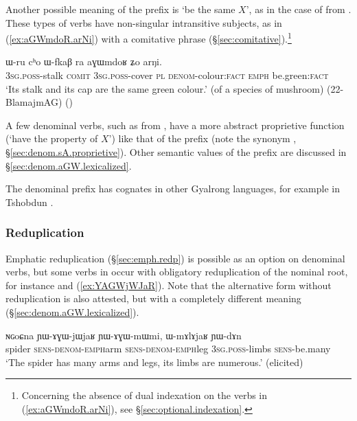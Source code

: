 Another possible meaning of the  prefix is `be the same $X$', as in the case of  from . These types of verbs have non-singular intransitive subjects, as in (\ref{ex:aGWmdoR.arNi}) with a comitative phrase (§\ref{sec:comitative}).\footnote{Concerning the absence of dual indexation on the verbs in (\ref{ex:aGWmdoR.arNi}), see §\ref{sec:optional.indexation}. }

\begin{exe}
\ex \label{ex:aGWmdoR.arNi}
\gll ɯ-ru cʰo ɯ-fkaβ ra aɣɯmdoʁ ʑo arŋi. \\
\textsc{3sg}.\textsc{poss}-stalk \textsc{comit} \textsc{3sg}.\textsc{poss}-cover \textsc{pl} \textsc{denom}-colour:\textsc{fact} \textsc{emph} be.green:\textsc{fact} \\
\glt `Its stalk and its cap are the same green colour.' (of a species of mushroom) (22-BlamajmAG)
()
 \end{exe}

A few  denominal verbs, such as 	from , have a more abstract proprietive function (`have the property of $X$') like that of the  prefix (note the synonym , §\ref{sec:denom.sA.proprietive}). Other semantic values of the  prefix are  discussed in §\ref{sec:denom.aGW.lexicalized}.

The  denominal prefix has cognates in other Gyalrong languages, for example  in Tshobdun \citep{jackson14morpho}.

\subsubsection{Reduplication} \label{sec:denom.aGW.redp}
Emphatic reduplication (§\ref{sec:emph.redp}) is  possible as an option on denominal verbs, but some verbs in  occur with obligatory reduplication of the nominal root, for instance  and  (\ref{ex:YAGWjWJaR}). Note that the alternative form  without reduplication is also attested, but with a completely different meaning (§\ref{sec:denom.aGW.lexicalized}).

\begin{exe}
\ex \label{ex:YAGWjWJaR}
\gll ɴɢoɕna ɲɯ-ɤɣɯ-jɯ\redp{}jaʁ ɲɯ-ɤɣɯ-mɯ\redp{}mi, ɯ-mɤlɤjaʁ ɲɯ-dɤn \\
spider \textsc{sens}-\textsc{denom}-\textsc{emph}\redp{}arm  \textsc{sens}-\textsc{denom}-\textsc{emph}\redp{}leg \textsc{3sg}.\textsc{poss}-limbs \textsc{sens}-be.many \\
\glt  `The spider has many arms and legs, its limbs are numerous.' (elicited)
 \end{exe}

